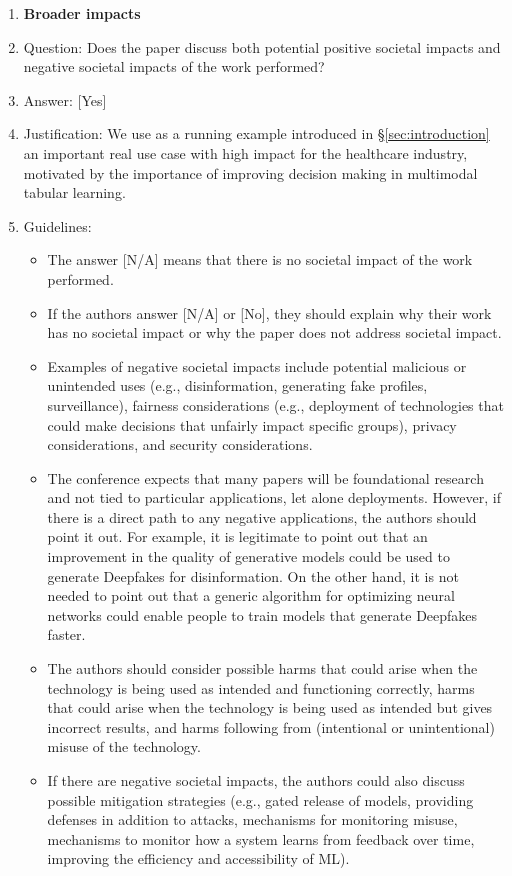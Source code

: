 \documentclass{llmxive}
\providecommand{\answerYes}[1][]{[Yes]#1}
\providecommand{\answerNo}[1][]{[No]#1}
\providecommand{\answerNA}[1][]{[N/A]#1}
\begin{document}
\begin{enumerate}
\item {\bf Broader impacts}
    \item[] Question: Does the paper discuss both potential positive societal impacts and negative societal impacts of the work performed?
    \item[] Answer: \answerYes{}
    \item[] Justification: We use as a running example introduced in \S\ref{sec:introduction} an important real use case
with high impact for the healthcare industry, motivated by the importance of improving
decision making in multimodal tabular learning.
    \item[] Guidelines:
    \begin{itemize}
        \item The answer \answerNA{} means that there is no societal impact of the work performed.
        \item If the authors answer \answerNA{} or \answerNo, they should explain why their work has no societal impact or why the paper does not address societal impact.
        \item Examples of negative societal impacts include potential malicious or unintended uses (e.g., disinformation, generating fake profiles, surveillance), fairness considerations (e.g., deployment of technologies that could make decisions that unfairly impact specific groups), privacy considerations, and security considerations.
        \item The conference expects that many papers will be foundational research and not tied to particular applications, let alone deployments. However, if there is a direct path to any negative applications, the authors should point it out. For example, it is legitimate to point out that an improvement in the quality of generative models could be used to generate Deepfakes for disinformation. On the other hand, it is not needed to point out that a generic algorithm for optimizing neural networks could enable people to train models that generate Deepfakes faster.
        \item The authors should consider possible harms that could arise when the technology is being used as intended and functioning correctly, harms that could arise when the technology is being used as intended but gives incorrect results, and harms following from (intentional or unintentional) misuse of the technology.
        \item If there are negative societal impacts, the authors could also discuss possible mitigation strategies (e.g., gated release of models, providing defenses in addition to attacks, mechanisms for monitoring misuse, mechanisms to monitor how a system learns from feedback over time, improving the efficiency and accessibility of ML).
    \end{itemize}
    

\end{enumerate}
\end{document}
